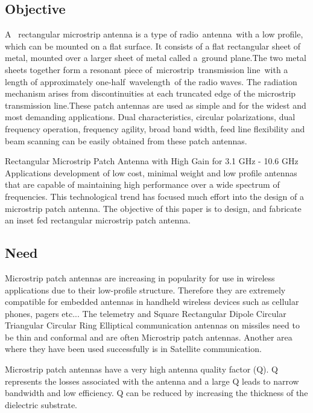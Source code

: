 

\subsection{Objective}\label{subs:Objective}
 \justify
   A  rectangular microstrip antenna is a type of radio antenna with a low profile, which can be mounted on a flat surface. It consists of a flat rectangular sheet of metal, mounted over a larger sheet of metal called a ground plane.The two metal sheets together form a resonant piece of microstrip transmission line with a length of approximately one-half wavelength of the radio waves. The radiation mechanism arises from discontinuities at each truncated edge of the microstrip transmission line.These patch antennas are used as simple and for the widest and most demanding applications. Dual characteristics, circular polarizations, dual frequency operation, frequency agility, broad band width, feed line flexibility and beam scanning can be easily obtained from these patch antennas.

 \justify
  Rectangular Microstrip Patch Antenna with High Gain for 3.1 GHz - 10.6 GHz Applications development of low cost, minimal weight and low profile antennas that are capable of maintaining high performance over a wide spectrum of frequencies. This technological trend has focused much effort into the design of a microstrip patch antenna. The objective of this paper is to design, and fabricate an inset fed rectangular microstrip patch antenna.

\subsection{Need}\label{sub:Need}
 \justify
   Microstrip patch antennas are increasing in popularity for use in wireless applications due to their low-profile structure. Therefore they are extremely compatible for embedded antennas in handheld wireless devices such as cellular phones, pagers etc... The telemetry and Square Rectangular Dipole Circular Triangular Circular Ring Elliptical communication antennas on missiles need to be thin and conformal and are often Microstrip patch antennas. Another area where they have been used successfully is in Satellite communication.

 \justify
   Microstrip patch antennas have a very high antenna quality factor (Q). Q represents the losses associated with the antenna and a large Q leads to narrow bandwidth and low efficiency. Q can be reduced by increasing the thickness of the dielectric substrate.

